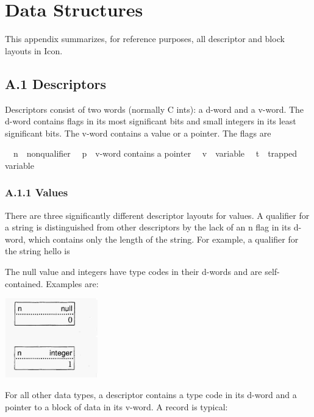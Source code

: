 \chapter{Data Structures}

This appendix summarizes, for reference purposes, all descriptor and
block layouts in Icon.

\section{A.1 Descriptors}

Descriptors consist of two words (normally C ints): a d-word and a
v-word. The d-word contains flags in its most significant bits and
small integers in its least significant bits. The v-word contains a
value or a pointer. The flags are


\ \ n\ \ nonqualifier\newline
\ \ p\ \ v-word contains a pointer\newline
\ \ v\ \ variable\newline
\ \ t\ \ trapped variable

\subsection{A.1.1 Values}

There are three significantly different descriptor layouts for
values. A qualifier for a string is distinguished from other
descriptors by the lack of an n flag in its d-word, which contains
only the length of the string. For example, a qualifier for the string
{\textquotedbl}hello{\textquotedbl} is


\bigskip


\bigskip


\bigskip


\bigskip


The null value and integers have type codes in their d-words and are
self-contained. Examples are:


\includegraphics[width=1.602in,height=1.3547in]{ib-img/ib-img111.jpg} 


For all other data types, a descriptor contains a type code in its
d-word and a pointer to a block of data in its v-word. A record is
typical:


